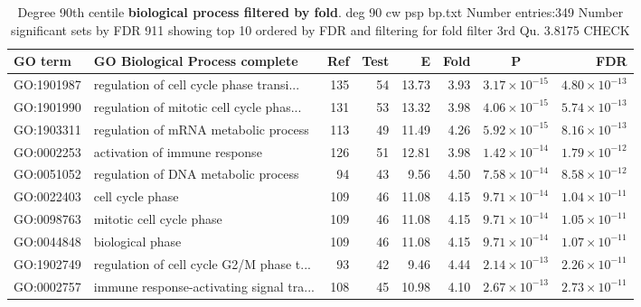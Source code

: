 \begin{table}[ht]
\centering
\begin{adjustbox}{width=\textwidth}
\begin{tabular}{llrrrrcr}
  \hline
GO term & GO \textbf{Biological Process }complete & Ref & Test & E & Fold & P & FDR \\ 
  \hline
GO:1901987 & regulation of cell cycle phase transi... & 135 & 54 & 13.73 & 3.93 & $3.17 \times 10^{-15}$ & $4.80 \times 10^{-13}$ \\ 
  GO:1901990 & regulation of mitotic cell cycle phas... & 131 & 53 & 13.32 & 3.98 & $4.06 \times 10^{-15}$ & $5.74 \times 10^{-13}$ \\ 
  GO:1903311 & regulation of mRNA metabolic process  & 113 & 49 & 11.49 & 4.26 & $5.92 \times 10^{-15}$ & $8.16 \times 10^{-13}$ \\ 
  GO:0002253 & activation of immune response  & 126 & 51 & 12.81 & 3.98 & $1.42 \times 10^{-14}$ & $1.79 \times 10^{-12}$ \\ 
  GO:0051052 & regulation of DNA metabolic process  & 94 & 43 & 9.56 & 4.50 & $7.58 \times 10^{-14}$ & $8.58 \times 10^{-12}$ \\ 
  GO:0022403 & cell cycle phase  & 109 & 46 & 11.08 & 4.15 & $9.71 \times 10^{-14}$ & $1.04 \times 10^{-11}$ \\ 
  GO:0098763 & mitotic cell cycle phase  & 109 & 46 & 11.08 & 4.15 & $9.71 \times 10^{-14}$ & $1.05 \times 10^{-11}$ \\ 
  GO:0044848 & biological phase  & 109 & 46 & 11.08 & 4.15 & $9.71 \times 10^{-14}$ & $1.07 \times 10^{-11}$ \\ 
  GO:1902749 & regulation of cell cycle G2/M phase t... & 93 & 42 & 9.46 & 4.44 & $2.14 \times 10^{-13}$ & $2.26 \times 10^{-11}$ \\ 
  GO:0002757 & immune response-activating signal tra... & 108 & 45 & 10.98 & 4.10 & $2.67 \times 10^{-13}$ & $2.73 \times 10^{-11}$ \\ 
  \hline
\end{tabular}
\end{adjustbox}
\caption{Degree 90th centile \textbf{biological process filtered by fold}. deg 90 cw psp bp.txt Number entries:349 Number significant sets by FDR 911 showing top 10 ordered by FDR and filtering for fold filter 3rd Qu. 3.8175 CHECK} 
\label{tab:deg 90 cw psp bp.txt Number entries:349 Number significant sets by FDR 911 showing top 10 ordered by FDR and filtering for fold filter 3rd Qu. 3.8175}
\end{table}

